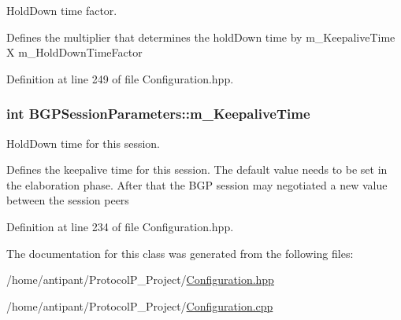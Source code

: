 Hold\-Down time factor. 

Defines the multiplier that determines the hold\-Down time by m\-\_\-\-Keepalive\-Time X m\-\_\-\-Hold\-Down\-Time\-Factor 

Definition at line 249 of file Configuration.\-hpp.

\hypertarget{classBGPSessionParameters_a465c4710f73834f9d0daaf9defe6ccc8}{
\subsubsection[{m\-\_\-\-Keepalive\-Time}]{\setlength{\rightskip}{0pt plus 5cm}int B\-G\-P\-Session\-Parameters\-::m\-\_\-\-Keepalive\-Time\hspace{0.3cm}{\ttfamily [protected]}}}\label{classBGPSessionParameters_a465c4710f73834f9d0daaf9defe6ccc8}


Hold\-Down time for this session. 

Defines the keepalive time for this session. The default value needs to be set in the elaboration phase. After that the B\-G\-P session may negotiated a new value between the session peers 

Definition at line 234 of file Configuration.\-hpp.



The documentation for this class was generated from the following files\-:\begin{DoxyCompactItemize}
\item 
/home/antipant/\-Protocol\-P\-\_\-\-Project/\hyperlink{Configuration_8hpp}{Configuration.\-hpp}\item 
/home/antipant/\-Protocol\-P\-\_\-\-Project/\hyperlink{Configuration_8cpp}{Configuration.\-cpp}\end{DoxyCompactItemize}

